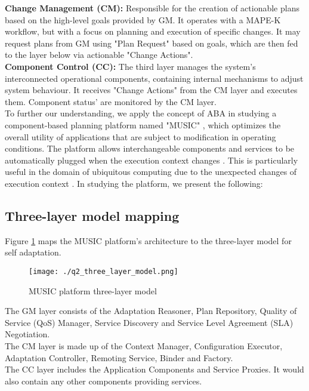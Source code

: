 \documentclass[conference]{IEEEtran}
\begin{document}
\noindent \textbf{Change Management (CM):} Responsible for the creation of actionable plans based on the high-level goals provided by GM. It operates with a MAPE-K workflow, but with a focus on planning and execution of specific changes. It may request plans from GM using "Plan Request" based on goals, which are then fed to the layer below via actionable "Change Actions".\\

\noindent \textbf{Component Control (CC):} The third layer manages the system's interconnected operational components, containing internal mechanisms to adjust system behaviour. It receives "Change Actions" from the CM layer and executes them. Component status' are monitored by the CM layer.\\

To further our understanding, we apply the concept of ABA in studying a component-based planning platform named "MUSIC" \cite{MUSIC_pdf}, which optimizes the overall utility of applications that are subject to modification in operating conditions. The platform allows interchangeable components and services to be automatically plugged when the execution context changes \cite{quiz_pdf}. This is particularly useful in the domain of ubiquitous computing due to the unexpected changes of execution context \cite{MUSIC_pdf}. In studying the platform, we present the following:

\subsection{\textbf{Three-layer model mapping}}
Figure \ref{fig:q2_three_layer_model} maps the MUSIC platform's architecture to the three-layer model for self adaptation.

\begin{figure}[H]
	\centering
	\texttt{[image: ./q2\_three\_layer\_model.png]}
	\caption{MUSIC platform three-layer model}
	\label{fig:q2_three_layer_model}
\end{figure}

The GM layer consists of the Adaptation Reasoner, Plan Repository, Quality of Service (QoS) Manager, Service Discovery and Service Level Agreement (SLA) Negotiation.\\

The CM layer is made up of the Context Manager, Configuration Executor, Adaptation Controller, Remoting Service, Binder and Factory.\\

The CC layer includes the Application Components and Service Proxies. It would also contain any other components providing services.\\
\end{document}
